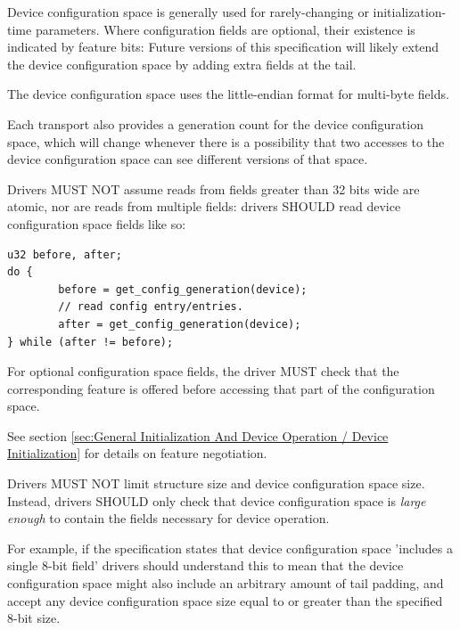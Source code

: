 Device configuration space is generally used for rarely-changing or
initialization-time parameters.  Where configuration fields are
optional, their existence is indicated by feature bits: Future
versions of this specification will likely extend the device
configuration space by adding extra fields at the tail.

\begin{note}
The device configuration space uses the little-endian format
for multi-byte fields.
\end{note}

Each transport also provides a generation count for the device configuration
space, which will change whenever there is a possibility that two
accesses to the device configuration space can see different versions of that
space.

Drivers MUST NOT assume reads from
fields greater than 32 bits wide are atomic, nor are reads from
multiple fields: drivers SHOULD read device configuration space fields like so:

\begin{lstlisting}
u32 before, after;
do {
        before = get_config_generation(device);
        // read config entry/entries.
        after = get_config_generation(device);
} while (after != before);
\end{lstlisting}

For optional configuration space fields, the driver MUST check that the
corresponding feature is offered before accessing that part of the configuration
space.
\begin{note}
See section \ref{sec:General Initialization And Device Operation / Device Initialization} for details on feature negotiation.
\end{note}

Drivers MUST
NOT limit structure size and device configuration space size.  Instead,
drivers SHOULD only check that device configuration space is {\em large enough} to
contain the fields necessary for device operation.

\begin{note}
For example, if the specification states that device configuration
space 'includes a single 8-bit field' drivers should understand this to mean that
the device configuration space might also include an arbitrary amount of
tail padding, and accept any device configuration space size equal to or
greater than the specified 8-bit size.
\end{note}

